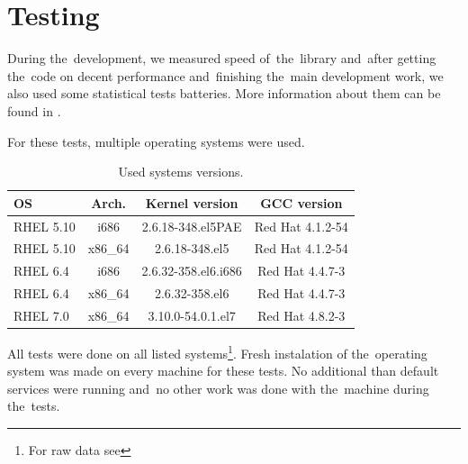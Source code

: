 \chapter{Testing} \label{chap:testing}
\par{
During the~development, we measured speed of~the~library and~after getting the~code on decent performance and~finishing the~main development work, we also used some statistical tests batteries. More information about them can be found in .
}
\par{
For these tests, multiple operating systems were used.
\begin{table}[h!]
  \begin{center}
    \begin{tabular}{|l|c|c|c|}
      \hline
      OS & Arch. & Kernel version & GCC version\\
      \hline
      \hline
      RHEL 5.10 & i686 & 2.6.18-348.el5PAE & Red Hat 4.1.2-54\\
      \hline
      RHEL 5.10 & x86\_64 & 2.6.18-348.el5 & Red Hat 4.1.2-54\\
      \hline
      RHEL 6.4 & i686 & 2.6.32-358.el6.i686 & Red Hat 4.4.7-3\\
      \hline
      RHEL 6.4 & x86\_64 & 2.6.32-358.el6 & Red Hat 4.4.7-3\\
      \hline
      RHEL 7.0 & x86\_64 & 3.10.0-54.0.1.el7 & Red Hat 4.8.2-3\\
      \hline
    \end{tabular}
    \caption{Used systems versions.}
    \label{tab:testing:systems}
  \end{center}
\end{table}
}

\par{
All tests were done on all listed systems\footnote{For raw data see }. Fresh instalation of the~operating system was made on every machine for these tests. No additional than default services were running and~no other work was done with the~machine during the~tests.
}


